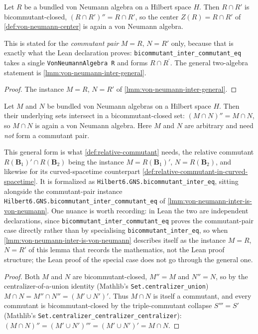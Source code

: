 \begin{lemma}
    \label{lmm:von-neumann-inter-is-von-neumann}
    \leanok
    Let $R$ be a bundled von Neumann algebra on a Hilbert space $H$. Then $R \cap R'$ is bicommutant-closed, $(R \cap R')'' = R \cap R'$, so the center $Z(R) = R \cap R'$ of \ref{def:von-neumann-center} is again a von Neumann algebra.

    This is stated for the \emph{commutant pair} $M = R$, $N = R'$ only, because that is exactly what the Lean declaration proves: \texttt{bicommutant\_inter\_commutant\_eq} takes a single \texttt{VonNeumannAlgebra R} and forms $R \cap R^{\prime}$. The general two-algebra statement is \ref{lmm:von-neumann-inter-general}.
\end{lemma}
\begin{proof}
    \leanok
    The instance $M = R$, $N = R'$ of \ref{lmm:von-neumann-inter-general}.
\end{proof}

\begin{lemma}
    \label{lmm:von-neumann-inter-general}
    \leanok
    Let $M$ and $N$ be bundled von Neumann algebras on a Hilbert space $H$. Then their underlying sets intersect in a bicommutant-closed set: $(M \cap N)'' = M \cap N$, so $M \cap N$ is again a von Neumann algebra. Here $M$ and $N$ are arbitrary and need \emph{not} form a commutant pair.

    This general form is what \ref{def:relative-commutant} needs, the relative commutant $R(\mathbf{B}_1)' \cap R(\mathbf{B}_2)$ being the instance $M = R(\mathbf{B}_1)'$, $N = R(\mathbf{B}_2)$, and likewise for its curved-spacetime counterpart \ref{def:relative-commutant-in-curved-spacetime}. It is formalized as \texttt{Hilbert6.GNS.bicommutant\_inter\_eq}, sitting alongside the commutant-pair instance \texttt{Hilbert6.GNS.bicommutant\_inter\_commutant\_eq} of \ref{lmm:von-neumann-inter-is-von-neumann}. One nuance is worth recording: in Lean the two are independent declarations, since \texttt{bicommutant\_inter\_commutant\_eq} proves the commutant-pair case directly rather than by specialising \texttt{bicommutant\_inter\_eq}, so when \ref{lmm:von-neumann-inter-is-von-neumann} describes itself as the instance $M = R$, $N = R'$ of this lemma that records the mathematics, not the Lean proof structure; the Lean proof of the special case does not go through the general one.
\end{lemma}
\begin{proof}
    \leanok
    Both $M$ and $N$ are bicommutant-closed, $M'' = M$ and $N'' = N$, so by the centralizer-of-a-union identity (Mathlib's \texttt{Set.centralizer\_union}) $M \cap N = M'' \cap N'' = (M' \cup N')'$. Thus $M \cap N$ is itself a commutant, and every commutant is bicommutant-closed by the triple-commutant collapse $S''' = S'$ (Mathlib's \texttt{Set.centralizer\_centralizer\_centralizer}): $(M \cap N)'' = (M' \cup N')''' = (M' \cup N')' = M \cap N$.
\end{proof}

